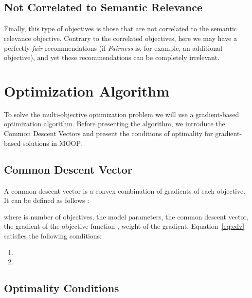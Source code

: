 \documentclass[letterpaper]{article}
\begin{document}
\subsection{Not Correlated to Semantic Relevance}
\paragraph{}

Finally, this type of objectives is those that are not correlated to the semantic relevance objective. Contrary to the correlated objectives, here we may have a perfectly \textit{fair} recommendations (if \textit{Fairness} is, for example, an additional objective), and yet these recommendations can be completely irrelevant.



\section{Optimization Algorithm}
To solve the multi-objective optimization problem we will use a gradient-based optimization algorithm. Before presenting the algorithm, we introduce the Common Descent Vectors and present the conditions of optimality for gradient-based solutions in MOOP.

\subsection{Common Descent Vector}
\paragraph{}

A common descent vector is a convex combination of gradients of each objective. It can be defined as follows \cite{desideri:hal-00768935}:


where  is number of objectives,  the model parameters,  the common descent vector,  the gradient of the objective function ,  weight of the  gradient. Equation~\ref{eq:cdv} satisfies the following conditions:

\begin{enumerate}
    \item 
    \item 
\end{enumerate}

\subsection{Optimality Conditions}
\end{document}
